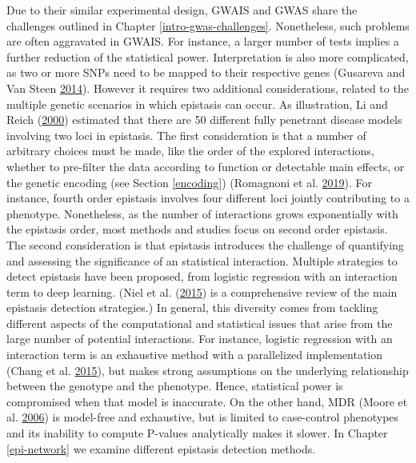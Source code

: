 \documentclass[
  11pt,
]{env/yjiao}
\begin{document}
Due to their similar experimental design, GWAIS and GWAS share the challenges outlined in Chapter \ref{intro-gwas-challenges}. Nonetheless, such problems are often aggravated in GWAIS. For instance, a larger number of tests implies a further reduction of the statistical power. Interpretation is also more complicated, as two or more SNPs need to be mapped to their respective genes (Gusareva and Van Steen \protect\hyperlink{ref-gusareva_practical_2014}{2014}). However it requires two additional considerations, related to the multiple genetic scenarios in which epistasis can occur. As illustration, Li and Reich (\protect\hyperlink{ref-li_complete_2000}{2000}) estimated that there are 50 different fully penetrant disease models involving two loci in epistasis. The first consideration is that a number of arbitrary choices must be made, like the order of the explored interactions, whether to pre-filter the data according to function or detectable main effects, or the genetic encoding (see Section \ref{encoding}) (Romagnoni et al. \protect\hyperlink{ref-romagnoni_comparative_2019}{2019}). For instance, fourth order epistasis involves four different loci jointly contributing to a phenotype. Nonetheless, as the number of interactions grows exponentially with the epistasis order, most methods and studies focus on second order epistasis. The second consideration is that epistasis introduces the challenge of quantifying and assessing the significance of an statistical interaction. Multiple strategies to detect epistasis have been proposed, from logistic regression with an interaction term to deep learning. (Niel et al. (\protect\hyperlink{ref-niel_survey_2015}{2015}) is a comprehensive review of the main epistasis detection strategies.) In general, this diversity comes from tackling different aspects of the computational and statistical issues that arise from the large number of potential interactions. For instance, logistic regression with an interaction term is an exhaustive method with a parallelized implementation (Chang et al. \protect\hyperlink{ref-chang_second-generation_2015}{2015}), but makes strong assumptions on the underlying relationship between the genotype and the phenotype. Hence, statistical power is compromised when that model is inaccurate. On the other hand, MDR (Moore et al. \protect\hyperlink{ref-moore_flexible_2006}{2006}) is model-free and exhaustive, but is limited to case-control phenotypes and its inability to compute P-values analytically makes it slower. In Chapter \ref{epi-network} we examine different epistasis detection methods.
\end{document}
